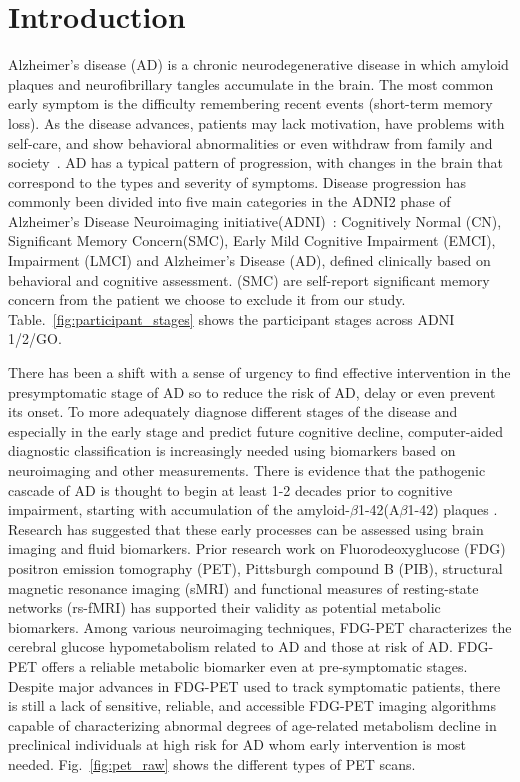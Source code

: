 \documentclass[authoryear,preprint,revi	ew,12pt]{elsarticle}
\begin{document}
\section{Introduction}
Alzheimer’s disease (AD) is a chronic neurodegenerative disease in which amyloid plaques and neurofibrillary tangles accumulate in the brain. The most common early symptom is the difficulty remembering recent events (short-term memory loss). As the disease advances, patients may lack motivation, have problems with self-care, and show behavioral abnormalities or even withdraw from family and society~\citep{Burns:2009}. AD has a typical pattern of progression, with changes in the brain that correspond to the types and severity of symptoms. Disease progression has commonly been divided into five main categories in the ADNI2 phase of Alzheimer's Disease Neuroimaging initiative(ADNI)~\citep{weiner2013alzheimer}: Cognitively Normal (CN), Significant Memory Concern(SMC), Early Mild Cognitive Impairment (EMCI), Impairment (LMCI) and Alzheimer's Disease (AD), defined clinically based on behavioral and cognitive assessment. (SMC) are self-report significant memory concern from the patient we choose to exclude it from our study. Table.~\ref{fig:participant_stages} shows the participant stages across ADNI 1/2/GO.

There has been a shift with a sense of urgency to find effective intervention in the presymptomatic stage of AD so to reduce the risk of AD, delay or even prevent its onset. To more adequately diagnose different stages of the disease and especially in the early stage and predict future cognitive decline, computer-aided diagnostic classification is increasingly needed using biomarkers based on neuroimaging and other measurements.
There is evidence that the pathogenic cascade of AD is thought to begin at least 1-2 decades prior to cognitive impairment, starting with accumulation of the amyloid-$\beta$1-42(A$\beta$1-42) plaques \citep{langbaum2013ushering}. Research has suggested that these early processes can be assessed using brain imaging and fluid biomarkers. Prior research work on Fluorodeoxyglucose (FDG) positron emission tomography (PET), Pittsburgh compound B (PIB), structural magnetic resonance imaging (sMRI) and functional measures of resting-state networks (rs-fMRI) has supported their validity as potential metabolic biomarkers. Among various neuroimaging techniques, FDG-PET characterizes the cerebral glucose hypometabolism related to AD and those at risk of AD. FDG-PET offers a reliable metabolic biomarker even at pre-symptomatic stages. Despite major advances in FDG-PET used to track symptomatic patients, there is still a lack of sensitive, reliable, and accessible FDG-PET imaging algorithms capable of characterizing abnormal degrees of age-related metabolism decline in preclinical individuals at high risk for AD whom early intervention is most needed. Fig.~\ref{fig:pet_raw} shows the different types of PET scans.
\end{document}
